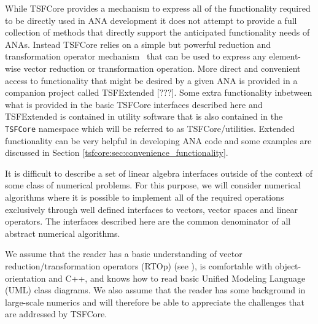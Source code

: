 While TSFCore provides a mechanism to express all of the functionality
required to be directly used in ANA development it does not attempt to
provide a full collection of methods that directly support the
anticipated functionality needs of ANAs.  Instead TSFCore relies on a
simple but powerful reduction and transformation operator
mechanism~\cite{ref:rtop_toms} that can be used to express any
element-wise vector reduction or transformation operation.  More
direct and convenient access to functionality that might be desired by
a given ANA is provided in a companion project called TSFExtended
[???].  Some extra functionality inbetween what is provided in the
basic TSFCore interfaces described here and TSFExtended is contained
in utility software that is also contained in the {}\texttt{TSFCore}
namespace which will be referred to as TSFCore/utilities.  Extended
functionality can be very helpful in developing ANA code and some
examples are discussed in Section
{}\ref{tsfcore:sec:convenience_functionality}.

It is difficult to describe a set of linear algebra interfaces outside
of the context of some class of numerical problems.  For this purpose,
we will consider numerical algorithms where it is possible to
implement all of the required operations exclusively through well
defined interfaces to vectors, vector spaces and linear operators.
The interfaces described here are the common denominator of all
abstract numerical algorithms.

We assume that the reader has a basic understanding of vector
reduction/transformation operators (RTOp) (see
{}\cite{ref:rtop_toms}), is comfortable with object-orientation
{}\cite{ref:gama_et_al_1995} and C++, and knows how to read basic
Unified Modeling Language (UML) {}\cite{ref:uml_distilled_2nd_ed}
class diagrams.  We also assume that the reader has some background in
large-scale numerics and will therefore be able to appreciate the
challenges that are addressed by TSFCore.


